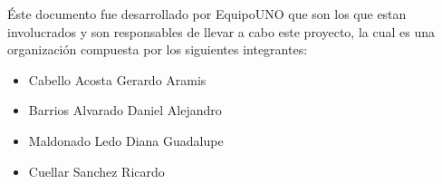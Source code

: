\'Este documento fue desarrollado por EquipoUNO que son los que estan involucrados y son responsables de llevar a cabo este proyecto, la cual es una organizaci\'on compuesta por los siguientes integrantes:
\begin{itemize}
\item Cabello Acosta Gerardo Aramis
\item Barrios Alvarado Daniel Alejandro
\item Maldonado Ledo Diana Guadalupe
\item Cuellar Sanchez Ricardo
\end{itemize}